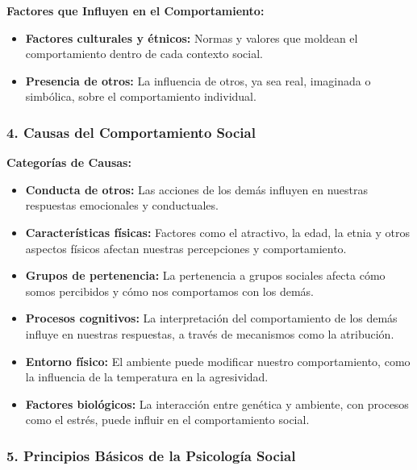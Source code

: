 \documentclass[
]{website}
\begin{document}
\textbf{Factores que Influyen en el Comportamiento:}

\begin{itemize}
\item
  \textbf{Factores culturales y étnicos:} Normas y valores que moldean el comportamiento dentro de cada contexto social.
\item
  \textbf{Presencia de otros:} La influencia de otros, ya sea real, imaginada o simbólica, sobre el comportamiento individual.
\end{itemize}

\subsubsection*{4. Causas del Comportamiento Social}\label{causas-del-comportamiento-social}

\textbf{Categorías de Causas:}

\begin{itemize}
\item
  \textbf{Conducta de otros:} Las acciones de los demás influyen en nuestras respuestas emocionales y conductuales.
\item
  \textbf{Características físicas:} Factores como el atractivo, la edad, la etnia y otros aspectos físicos afectan nuestras percepciones y comportamiento.
\item
  \textbf{Grupos de pertenencia:} La pertenencia a grupos sociales afecta cómo somos percibidos y cómo nos comportamos con los demás.
\item
  \textbf{Procesos cognitivos:} La interpretación del comportamiento de los demás influye en nuestras respuestas, a través de mecanismos como la atribución.
\item
  \textbf{Entorno físico:} El ambiente puede modificar nuestro comportamiento, como la influencia de la temperatura en la agresividad.
\item
  \textbf{Factores biológicos:} La interacción entre genética y ambiente, con procesos como el estrés, puede influir en el comportamiento social.
\end{itemize}

\subsubsection*{5. Principios Básicos de la Psicología Social}\label{principios-buxe1sicos-de-la-psicologuxeda-social-1}
\end{document}
